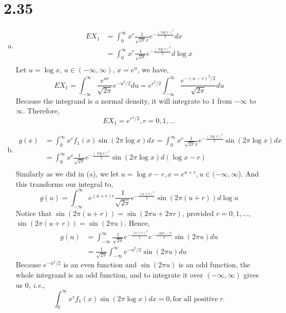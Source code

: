 \documentclass[letterpaper]{article}
\newcommand{\intii}{\int_{-\infty}^\infty}
\newcommand{\intzi}{\int_0^\infty}
\begin{document}
    \section*{2.35}
    \begin{enumerate}[(a)]
    \item
    \begin{align*}
    EX_1 & = \intzi x^r \frac{1}{\sqrt{2\pi}x} e^{-\frac{(\log x)^2}{2}} dx \\
    & = \intzi x^r \frac{1}{\sqrt{2\pi}} e^{-\frac{(\log x)^2}{2}} d \log x\\
    \end{align*}
    Let $u = \log x$, $u \in (-\infty, \infty)$, $x = e^u$, we have,
    \[
    EX_1 = \intii \frac{e^{ur}}{\sqrt{2\pi}} e^{-u^2/2} du
    = e^{r^2/2} \intii \frac{e^{-(u-r)^2/2}}{\sqrt{2\pi}} du
    \]
    Because the integrand is a normal density, it will integrate to $1$ from $-\infty$ to $\infty$. Therefore,
    \[
    EX_1 = e^{r^2/2}, r = 0, 1, \dots
    \]
    \item 
    \begin{align*}
    g(x) & = \intzi x^r f_1(x) \sin(2\pi \log x)dx 
    = \intzi x^r \frac{1}{\sqrt{2\pi}x} e^{-\frac{(\log x)^2}{2}} \sin(2\pi \log x) dx \\
    & = \intzi x^r \frac{1}{\sqrt{2\pi}} e^{-\frac{(\log x)^2}{2}} \sin(2\pi \log x) d(\log x - r) \\
    \end{align*}
    Similarly as we did in (a), we let $u = \log x - r , x = e^{u+r}, u \in (-\infty, \infty$). And this transforms our integral to,
    \[
    g(u) = \intii e^{(u+r)r} \frac{1}{\sqrt{2\pi}} e^{-\frac{(u+r)^2}{2}} \sin(2\pi (u+r)) d\log u 
    \]
    Notice that $\sin(2 \pi(u+r)) = \sin(2\pi u + 2\pi r)$, provided $r = 0, 1, \dots$, $\sin(2 \pi(u+r)) = \sin(2\pi u)$. Hence,
    \begin{align*}
    g(u) & = \intii \frac{1}{\sqrt{2\pi}} e^{-\frac{(u+r)^2}{2}} 
    e^{-\frac{-2ur-r^2}{2}} \sin(2\pi u) du \\
    & = \frac{1}{\sqrt{2\pi}} \intii e^{-u^2/2} \sin(2\pi u) du
    \end{align*}
    Because $e^{-u^2/2}$ is an even function and $\sin(2\pi u)$ is an odd function, the whole integrand is an odd function, and to integrate it over $(-\infty, \infty)$ gives us $0$, \emph{i.e.},
    \[
    \intzi x^r f_1(x) \sin(2\pi \log x)dx = 0, \text{for all positive}~r.
    \]
    \end{enumerate}
\end{document}
